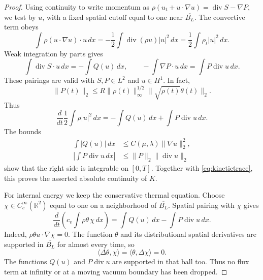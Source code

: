 \documentclass[11pt,letterpaper]{article}
\numberwithin{equation}{section}
\theoremstyle{definition}
\newcommand{\R}{\mathbb R}
\newcommand{\dd}{\,dx}
\newcommand{\Div}{\operatorname{div}}
\newcommand{\norm}[2]{\lVert#1\rVert_{#2}}
\begin{document}
\begin{proof}
Using continuity to write momentum as
$\rho(u_t+u\cdot\nabla u)=\Div S-\nabla P$, we test by $u$,
with a fixed spatial cutoff equal to one near $\overline{B_L}$.
The convective term obeys
\begin{equation}
 \int\rho(u\cdot\nabla u)\cdot u\dd
       =-\frac12\int\Div(\rho u)|u|^2\dd
       =\frac12\int\rho_t|u|^2\dd.
 \label{eq:kinetictransport}
\end{equation}
Weak integration by parts gives
\[
 \int\Div S\cdot u\dd=-\int Q(u)\dd,\qquad
 -\int\nabla P\cdot u\dd=\int P\Div u\dd.
\]
These pairings are valid with $S,P\in L^2$ and $u\in H^1$.
In fact,
\begin{equation}
 \norm{P(t)}{2}
       \le R\norm{\rho(t)}{\infty}^{1/2}
                    \norm{\sqrt{\rho(t)}\theta(t)}{2}.
 \label{eq:pressureLtwo}
\end{equation}
Thus
\begin{equation}
 \frac{d}{dt}\frac12\int\rho|u|^2\dd
       =-\int Q(u)\dd+\int P\Div u\dd.
 \label{eq:kineticbalance}
\end{equation}
The bounds
\begin{equation}
 \begin{aligned}
 \int|Q(u)|\dd&\le C(\mu,\lambda)\norm{\nabla u}{2}^2,\\
 \left|\int P\Div u\dd\right|
       &\le\norm{P}{2}\norm{\Div u}{2}
 \end{aligned}\label{eq:energyintegrability}
\end{equation}
show that the right side is integrable on $[0,T]$. Together with
\eqref{eq:kinetictrace}, this proves the asserted absolute
continuity of $K$.

For internal energy we keep the conservative thermal equation.
Choose $\chi\in C_c^\infty(\R^2)$ equal to one on a neighborhood
of $\overline{B_L}$. Spatial pairing with $\chi$ gives
\begin{equation}
 \frac{d}{dt}\left(c_v\int\rho\theta\,\chi\dd\right)
       =\int Q(u)\dd-\int P\Div u\dd.
 \label{eq:internalbalance}
\end{equation}
Indeed, $\rho\theta u\cdot\nabla\chi=0$. The function $\theta$
and its distributional spatial derivatives are supported in
$\overline{B_L}$ for almost every time, so
\[
 \langle\Delta\theta,\chi\rangle
       =\langle\theta,\Delta\chi\rangle=0.
\]
The functions $Q(u)$ and $P\Div u$ are supported in that ball too.
Thus no flux term at infinity or at a moving vacuum boundary has
been dropped.


\end{proof}
\end{document}
